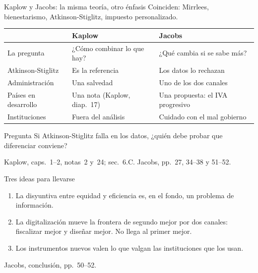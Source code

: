 \documentclass[aspectratio=169,11pt]{beamer}
\newcommand{\fuente}[1]{\par\vfill{\small\color{cGris}#1\par}}
\begin{document}
\begin{frame}{Kaplow y Jacobs: la misma teoría, otro énfasis}
  Coinciden: Mirrlees, bienestarismo, Atkinson-Stiglitz, impuesto personalizado.
  \par\smallskip
  \renewcommand{\arraystretch}{1.15}
  \begin{tabular}{@{}>{\raggedright\arraybackslash}p{}>{\raggedright\arraybackslash}p{}>{\raggedright\arraybackslash}p{}@{}}
    \toprule
    & \textbf{Kaplow} & \textbf{Jacobs} \\
    \midrule
    La pregunta & ¿Cómo combinar lo que hay? & ¿Qué cambia si se sabe más? \\
    Atkinson-Stiglitz & Es la referencia & Los datos lo rechazan \\
    Administración & Una salvedad & Uno de los dos canales \\
    Países en desarrollo & Una nota (Kaplow, diap.~17) & Una propuesta: el IVA progresivo \\
    Instituciones & Fuera del análisis & Cuidado con el mal gobierno \\
    \bottomrule
  \end{tabular}
  \pause
  \begin{alertblock}{Pregunta}
    Si Atkinson-Stiglitz falla en los datos, ¿quién debe probar que diferenciar conviene?
  \end{alertblock}
  \fuente{Kaplow, caps.~1--2, notas~2 y~24; sec.~6.C. Jacobs, pp.~27, 34--38 y 51--52.}
\end{frame}

\begin{frame}{Tres ideas para llevarse}
  \begin{enumerate}
    \item La disyuntiva entre equidad y eficiencia es, en el fondo, un problema de información.
    \pause
    \item La digitalización mueve la frontera de segundo mejor por dos canales: fiscalizar mejor y diseñar mejor. No llega al primer mejor.
    \pause
    \item Los instrumentos nuevos valen lo que valgan las instituciones que los usan.
  \end{enumerate}
  \fuente{Jacobs, conclusión, pp.~50--52.}
\end{frame}
\end{document}
